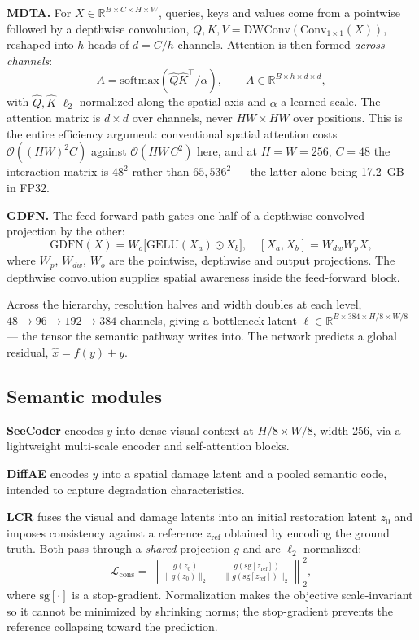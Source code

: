 \documentclass[conference]{IEEEtran}
\newcommand{\bs}[1]{\textbf{#1}}
\begin{document}
\textbf{MDTA.} For $X\in\mathbb{R}^{B\times C\times H\times W}$, queries, keys
and values come from a pointwise followed by a depthwise convolution,
$Q,K,V = \mathrm{DWConv}(\mathrm{Conv}_{1\times1}(X))$, reshaped into $h$ heads
of $d=C/h$ channels. Attention is then formed \emph{across channels}:
\begin{equation}
A = \mathrm{softmax}\!\left(\hat{Q}\hat{K}^{\top}/\alpha\right), \qquad
A \in \mathbb{R}^{B\times h\times d\times d},
\label{eq:mdta}
\end{equation}
with $\hat{Q},\hat{K}$ $\ell_2$-normalized along the spatial axis and $\alpha$
a learned scale. The attention matrix is $d\!\times\!d$ over channels, never
$HW\!\times\!HW$ over positions. This is the entire efficiency argument:
conventional spatial attention costs $\mathcal{O}((HW)^2C)$ against
$\mathcal{O}(HW\,C^2)$ here, and at $H=W=256$, $C=48$ the interaction matrix is
$48^2$ rather than $65{,}536^2$ --- the latter alone being 17.2~GB in FP32.

\textbf{GDFN.} The feed-forward path gates one half of a depthwise-convolved
projection by the other:
\begin{equation}
\mathrm{GDFN}(X) = W_o\big[\mathrm{GELU}(X_a)\odot X_b\big],\quad
[X_a,X_b] = W_{dw}W_pX,
\label{eq:gdfn}
\end{equation}
where $W_p$, $W_{dw}$, $W_o$ are the pointwise, depthwise and output
projections. The depthwise convolution supplies spatial awareness inside the
feed-forward block.

Across the hierarchy, resolution halves and width doubles at each level,
$48\!\to\!96\!\to\!192\!\to\!384$ channels, giving a bottleneck latent
$\ell\in\mathbb{R}^{B\times 384\times H/8\times W/8}$ --- the tensor the
semantic pathway writes into. The network predicts a global residual,
$\hat{x}=f(y)+y$.

\subsection{Semantic modules}

\bs{SeeCoder} encodes $y$ into dense visual context at $H/8\times W/8$, width
256, via a lightweight multi-scale encoder and self-attention blocks.

\bs{DiffAE} encodes $y$ into a spatial damage latent and a pooled semantic
code, intended to capture degradation characteristics.

\bs{LCR} fuses the visual and damage latents into an initial restoration latent
$z_0$ and imposes consistency against a reference $z_{\text{ref}}$ obtained by
encoding the ground truth. Both pass through a \emph{shared} projection $g$ and
are $\ell_2$-normalized:
\begin{equation}
\mathcal{L}_{\text{cons}} = \left\|
\tfrac{g(z_0)}{\|g(z_0)\|_2} -
\tfrac{g(\mathrm{sg}[z_{\text{ref}}])}{\|g(\mathrm{sg}[z_{\text{ref}}])\|_2}
\right\|_2^2 ,
\label{eq:lcr}
\end{equation}
where $\mathrm{sg}[\cdot]$ is a stop-gradient. Normalization makes the
objective scale-invariant so it cannot be minimized by shrinking norms; the
stop-gradient prevents the reference collapsing toward the prediction.
\end{document}
